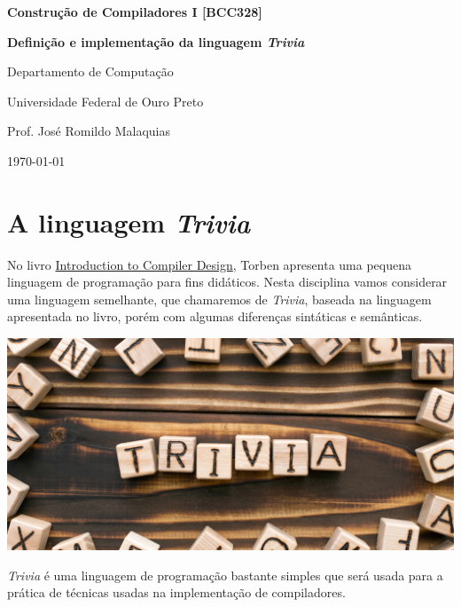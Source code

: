 \documentclass[a4paper,11pt,brazil]{article}
\newcommand{\lang}{\textsl{Trivia}}
\begin{document}
\begin{center}
  \textbf{Construção de Compiladores I [BCC328]}
\end{center}
\begin{tcolorbox}[colback=yellow!20]
  \begin{center}
    \textbf{\Large Definição e implementação da linguagem \lang{}}\\[1em]
  \end{center}
\end{tcolorbox}
\begin{center}
  Departamento de Computação\par
  Universidade Federal de Ouro Preto\par
  Prof. José Romildo Malaquias\par
  \today
\end{center}

\begin{abstract}
  \lang{} é uma pequena linguagem de programação usada para fins
  didáticos na aprendizagem de técnicas de construção de
  compiladores.
  
  Na disciplina de construção de compiladores serão propostas
  atividades de documentação e implementação de \lang{}.
\end{abstract}

\tableofcontents

\section{A linguagem \lang{}}

No livro
\href{https://www.springer.com/gp/book/9783319669656}{Introduction to
  Compiler Design}, Torben apresenta uma pequena linguagem de
programação para fins didáticos. Nesta disciplina vamos considerar uma
linguagem semelhante, que chamaremos de \lang{}, baseada na linguagem
apresentada no livro, porém com algumas diferenças sintáticas e
semânticas.
\begin{center}
  \includegraphics[width=.4\textwidth]{trivia.png}
\end{center}

\lang{} é uma linguagem de programação bastante simples que será usada
para a prática de técnicas usadas na implementação de compiladores.
\end{document}
